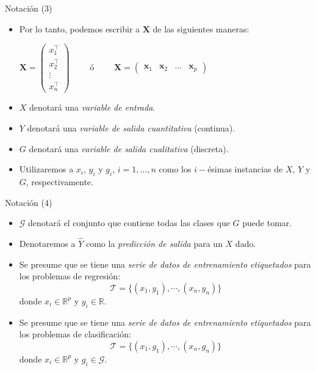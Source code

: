 \documentclass[usenames,dvipsnames]{beamer} %
\newcommand\defi[1]{\textcolor{NavyBlue}{\textit{#1}}}
\newcommand{\matr}[1]{\mathbf{#1}}
\begin{document}
\begin{frame}{Notaci\'on (3)}
    \begin{itemize}
        \item Por lo tanto, podemos escribir a $\matr{X}$ de las siguientes maneras:
         \begin{center}$\matr{X} = \begin{pmatrix} x_{1}^\intercal \\ x_{2}^\intercal \\ \vdots \\ x_{n}^\intercal\end{pmatrix}\qquad$ \'o $\qquad\matr{X} = \begin{pmatrix} \matr{x}_1 & \matr{x}_2 & \dots & \matr{x}_p \end{pmatrix}$
         \end{center}
        \item $X$ denotar\'a una \defi{variable de entrada}.
        \item $Y$ denotar\'a una \defi{variable de salida cuantitativa} (continua).
        \item $G$ denotar\'a una \defi{variable de salida cualitativa} (discreta).
        \item Utilizaremos a $x_i$, $y_i$ y $g_i$, $i=1,\dots,n$ como los $i-$\'esimas instancias de $X$, $Y$ y $G$, respectivamente.
    \end{itemize}
\end{frame}

\begin{frame}{Notaci\'on (4)}
    \begin{itemize}
        \item $\mathcal{G}$ denotar\'a el conjunto que contiene todas las clases que $G$ puede tomar.
        \item Denotaremos a $\hat{Y}$ como la \textit{predicci\'on de salida} para un $X$ dado.
        \item Se presume que se tiene una \defi{serie de datos de entrenamiento etiquetados} para los problemas de regresi\'on:
        \[ \mathcal{T} =  \{(x_{1}, y_{1}), \cdots, (x_{n}, y_{n}) \} \]
        donde $x_i \in \mathbb{R}^p$ y $y_i\in\mathbb{R}$.
        \item Se presume que se tiene una \defi{serie de datos de entrenamiento etiquetados} para los problemas de clasificaci\'on:
        \[ \mathcal{T} =  \{(x_{1}, g_{1}), \cdots, (x_{n}, g_{n}) \} \]
        donde $x_i \in \mathbb{R}^p$ y $g_i\in\mathcal{G}$.
    \end{itemize}
\end{frame}
\end{document}
